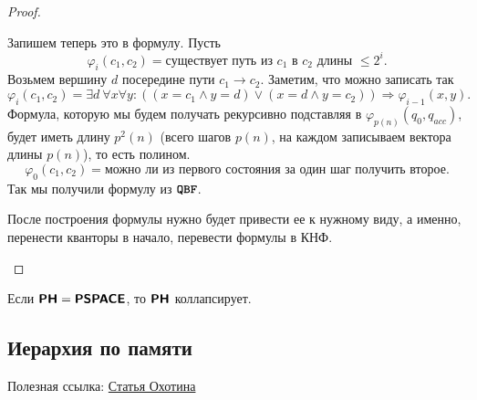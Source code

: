 \begin{proof}
\begin{itemize}
	Запишем теперь это в формулу.
	Пусть
	 \[
		 \varphi_i (c_1, c_2) = \text{существует путь из } c_1 \text{ в } c_2 \text{ длины } \le 2^{i}
	 .\] 
	Возьмем вершину $ d$ посередине пути $ c_1 \to c_2$. Заметим, что можно записать так
	\[
		 \varphi_i(c_1, c_2) = \exists d  ~\forall x \forall y \colon   \left( (x = c_1 \wedge  y = d) \vee (x = d \wedge  y = c_2) \right)  \Longrightarrow \varphi _{i-1}(x, y)
	 .\] 
	Формула, которую мы будем получать рекурсивно подставляя в $ \varphi _{p(n)}(q_0, q_{acc})$, будет иметь длину $ p^2(n)$ (всего шагов $p(n)$, на каждом записываем вектора длины $p(n)$), то есть полином.
	\[
		 \varphi _0(c_1, c_2) = \text{можно ли из первого состояния за один шаг получить второе}
	.\] 
	Так мы получили формулу из ${{\textbf{\texttt{QBF}}}}$.
    \end{itemize}
	\begin{note}
	    После построения формулы нужно будет привести ее к нужному виду, а именно, перенести кванторы в начало, перевести формулы в КНФ. 
	\end{note}
\end{proof}
\begin{cor}
    Если $ \textmd{\textbf{\textsf{PH}}} = \textmd{\textbf{\textsf{PSPACE}}}$, то $ \textmd{\textbf{\textsf{PH}}}$ коллапсирует.
\end{cor}


\subsection{Иерархия по памяти}
Полезная ссылка:  \href{https://users.math-cs.spbu.ru/~okhotin/teaching/tcs3_2018/okhotin_tcs3_2018_l12.pdf}{Статья Охотина}

